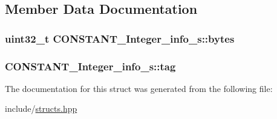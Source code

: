 \subsection{Member Data Documentation}
\hypertarget{structCONSTANT__Integer__info__s_adf82e6a8faf5fd5f2dbb063e4d30edf7}{
\subsubsection[{bytes}]{\setlength{\rightskip}{0pt plus 5cm}uint32\+\_\+t C\+O\+N\+S\+T\+A\+N\+T\+\_\+\+Integer\+\_\+info\+\_\+s\+::bytes}}\label{structCONSTANT__Integer__info__s_adf82e6a8faf5fd5f2dbb063e4d30edf7}
\hypertarget{structCONSTANT__Integer__info__s_ab64157620cc3546f13d041e230280fb9}{
\subsubsection[{tag}]{ C\+O\+N\+S\+T\+A\+N\+T\+\_\+\+Integer\+\_\+info\+\_\+s\+::tag}}\label{structCONSTANT__Integer__info__s_ab64157620cc3546f13d041e230280fb9}


The documentation for this struct was generated from the following file\+:\begin{DoxyCompactItemize}
\item 
include/\hyperlink{structs_8hpp}{structs.\+hpp}\end{DoxyCompactItemize}
